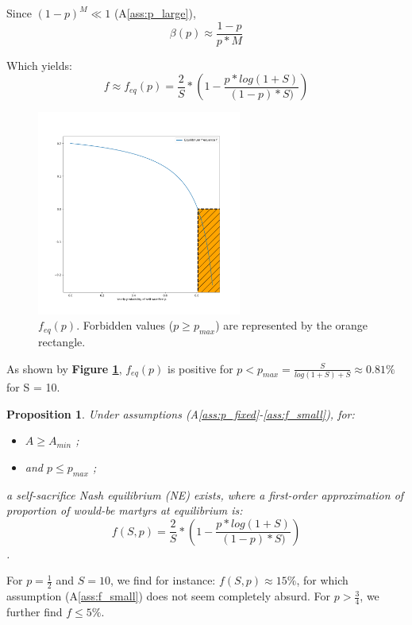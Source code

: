 \documentclass[a4paper,12pt]{report}
\newtheorem{prop}{Proposition}
\begin{document}


Since $(1-p)^M \ll 1$ (A\ref{ass:p_large}),
\[\beta(p) \approx \frac{1-p}{p*M}\]

Which yields:
\begin{equation}
f \approx f_{eq}(p) = \frac{2}{S}*(1-\frac{p*log(1+S)}{(1-p)*S)})
\end{equation}

\begin{figure}[h]
    \centering
    \includegraphics[width=0.6\textwidth]{Exo_f_ESS}
    \caption{$f_{eq}(p)$. Forbidden values ($p \geq p_{max}$) are 
    represented by the orange rectangle.}
    \label{fig:f_ESS}
    \end{figure}

As shown by \textbf{Figure \ref{fig:f_ESS}}, $f_{eq}(p)$ is positive for
$p < p_{max} = \frac{S}{log(1+S)+S} \approx 0.81\%$ for S = 10. 

\begin{prop}
Under assumptions (A\ref{ass:p_fixed}-\ref{ass:f_small}), for:
\begin{itemize}
    \item $A \geq A_{min}$ ;
    \item and $p \leq p_{max}$ ;
\end{itemize}
a self-sacrifice Nash equilibrium (NE) exists, where a first-order
approximation of proportion of would-be martyrs at equilibrium is:
\[f(S,p) = \frac{2}{S}*(1-\frac{p*log(1+S)}{(1-p)*S)})\].
\end{prop}

For $p=\frac{1}{2}$ and $S=10$, we find for instance: $f(S,p) \approx 15\%$, for
which assumption (A\ref{ass:f_small}) does not seem completely absurd.
For $p>\frac{3}{4}$, we further find $f\leq{5\%}$.
\end{document}
